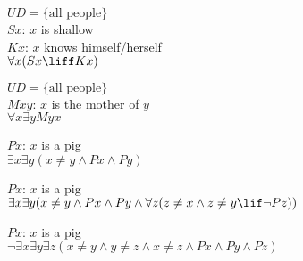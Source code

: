 \item {
$ UD = \{ \textrm{all people} \} $ \\
$Sx$: $x$ is shallow \\
$Kx$: $x$ knows himself/herself \\
$ \forall x (Sx \liff Kx) $
}

\item {
$ UD = \{ \textrm{all people} \} $ \\
$Mxy$: $x$ is the mother of $y$ \\
$ \forall x \exists y Myx $
}

\setcounter{enumi}{18}
\item {
$Px$: $x$ is a pig \\
$ \exists x \exists y (x \neq y \land Px \land Py) $
}

\item {
$Px$: $x$ is a pig \\
$ \exists x \exists y (x \neq y \land Px \land Py \land \forall z (z \neq x \land z \neq y \lif \lnot Pz)) $
}

\item {
$Px$: $x$ is a pig \\
$ \lnot \exists x \exists y \exists z (x \neq y \land y \neq z \land x \neq z \land Px \land Py \land Pz) $
}

